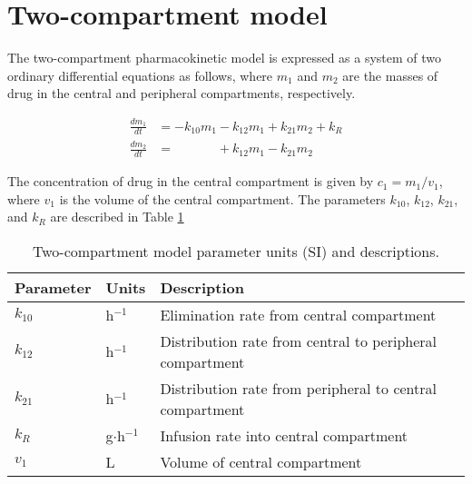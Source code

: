 \documentclass{article}
\begin{document}
\section{Two-compartment model}
The two-compartment pharmacokinetic model is expressed as a system of two ordinary differential equations as follows, where $m_1$ and $m_2$ are the masses of drug in the central and peripheral compartments, respectively.

\begin{align}
\frac{dm_1}{dt} &= -k_{10}m_1 - k_{12}m_1 + k_{21}m_2 + k_R \nonumber \\
\frac{dm_2}{dt} &= \phantom{-k_{10}m_1} + k_{12}m_1 - k_{21}m_2 \nonumber
\end{align}

The concentration of drug in the central compartment is given by $c_1 = m_1/v_1$, where $v_1$ is the volume of the central compartment. The parameters $k_{10}$, $k_{12}$, $k_{21}$, and $k_R$ are described in Table \ref{tab:pkpars}

\begin{table}
\begin{tabular}{lll} \hline
Parameter & Units & Description \\ \hline
$k_{10}$ & h$^{-1}$ & Elimination rate from central compartment\\
$k_{12}$ & h$^{-1}$ & Distribution rate from central to peripheral compartment\\
$k_{21}$ & h$^{-1}$ & Distribution rate from peripheral to central compartment\\
$k_R$  & g$\cdot$h$^{-1}$ & Infusion rate into central compartment\\
$v_1$  & L & Volume of central compartment\\
\hline
\end{tabular}
\caption{Two-compartment model parameter units (SI) and descriptions. \label{tab:pkpars}}
\end{table}
\end{document}
